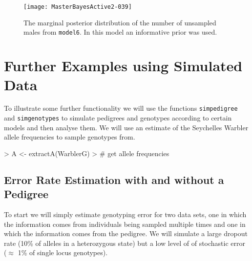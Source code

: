 \documentclass{article}
\begin{document}
\begin{figure}[!h]
\begin{center}
\texttt{[image: MasterBayesActive2-039]}
\end{center}
\caption{The marginal posterior distribution of the number of unsampled males from \texttt{model6}. In this model an informative prior was used.}
\label{model6US-fig}
\end{figure}

\section{\large{Further Examples using Simulated Data}}

To illustrate some further functionality we will use the functions \texttt{simpedigree} and \texttt{simgenotypes} to simulate pedigrees and genotypes according to certain models and then analyse them. We will use an estimate of the Seychelles Warbler allele frequencies to sample genotypes from.

\begin{Schunk}
\begin{Sinput}
> A <- extractA(WarblerG)
> # get allele frequencies
\end{Sinput}
\end{Schunk}

\subsection{Error Rate Estimation with and without a Pedigree}
\label{Error-sec}

 To start we will simply estimate genotyping error for two data sets, one in which the information comes from individuals being sampled multiple times and one in which the information comes from the pedigree. We will simulate a large dropout rate (10\% of alleles in a heterozygous state) but a low level of of stochastic error  ($\approx$ 1\% of single locus genotypes). 
\end{document}
